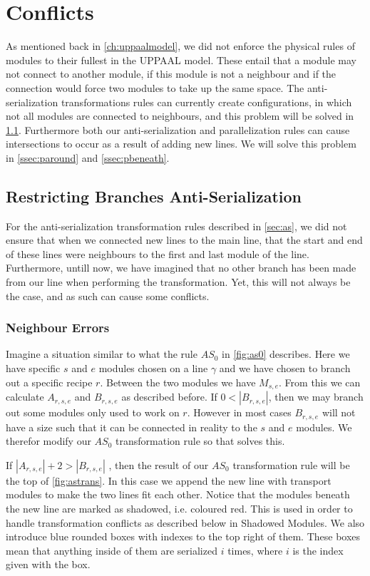 \section{Conflicts}\label{ssec:conflicts}
As mentioned back in \cref{ch:uppaalmodel}, we did not enforce the physical rules of modules to their fullest in the UPPAAL model. These entail that a module may not connect to another module, if this module is not a neighbour and if the connection would force two modules to take up the same space. The anti-serialization transformations rules can currently create configurations, in which not all modules are connected to neighbours, and this problem will be solved in \cref{ssec:restrictbranch}. Furthermore both our anti-serialization and parallelization rules can cause intersections to occur as a result of adding new lines. We will solve this problem in \cref{ssec:paround} and \cref{ssec:pbeneath}.


\subsection{Restricting Branches Anti-Serialization}\label{ssec:restrictbranch}
For the anti-serialization transformation rules described in \cref{sec:as}, we did not ensure that when we connected new lines to the main line, that the start and end of these lines were neighbours to the first and last module of the line. Furthermore, untill now, we have imagined that no other branch has been made from our line when performing the transformation. Yet, this will not always be the case, and as such can cause some conflicts.

\subsubsection{Neighbour Errors}
Imagine a situation similar to what the rule $AS_0$ in \cref{fig:as0} describes. Here we have specific $s$ and $e$ modules chosen on a line $\gamma$ and we have chosen to branch out a specific recipe $r$. Between the two modules we have $M_{s,e}$. From this we can calculate $A_{r,s,e}$ and $B_{r,s,e}$ as described before. If $0 < |B_{r,s,e}|$, then we may branch out some modules only used to work on $r$. However in  most cases $B_{r,s,e}$ will not have a size such that it can be connected in reality to the $s$ and $e$ modules. We therefor modify our $AS_0$ transformation rule so that solves this.

If $|A_{r,s,e}| + 2 > |B_{r,s,e}|$ , then the result of our $AS_0$ transformation rule will be the top of \cref{fig:astrans}. In this case we append the new line with transport modules to make the two lines fit each other. Notice that the modules beneath the new line are marked as shadowed, i.e. coloured red. This is used in order to handle transformation conflicts as described below in Shadowed Modules. We also introduce blue rounded boxes with indexes to the top right of them. These boxes mean that anything inside of them are serialized $i$ times, where $i$ is the index given with the box. 


